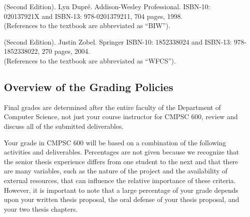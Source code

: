  (Second Edition). Lyn Dupr\'e.  Addison-Wesley
Professional.  ISBN-10: 020137921X and ISBN-13: 978-0201379211, 704 pages, 1998.\\ (References to the textbook are
abbreviated as ``BIW'').

 (Second Edition).  Justin Zobel.  Springer ISBN-10: 1852338024 and ISBN-13:
978-1852338022, 270 pages, 2004. \\ (References to the textbook are abbreviated as ``WFCS'').

\vspace*{-.15in}
\subsection*{Overview of the Grading Policies}

Final grades are determined after the entire faculty of the Department of Computer Science, not just your course
instructor for CMPSC 600, review and discuss all of the submitted deliverables.

Your grade in CMPSC 600 will be based on a combination of the following activities and deliverables. Percentages are not
given because we recognize that the senior thesis experience differs from one student to the next and that there are many
variables, such as the nature of the project and the availability of external resources, that can influence the relative
importance of these criteria. However, it is important to note that a large percentage of your grade depends upon your
written thesis proposal, the oral defense of your thesis proposal, and your two thesis chapters.

\vspace*{-.05in}

